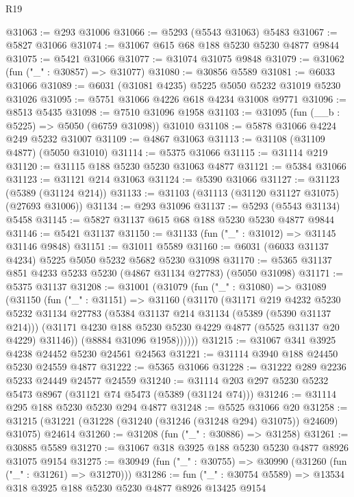 \begin{lexlean}{R19}
\begin{coremodule}
@31063 := @293 @31006
@31066 := @5293 (@5543 @31063) @5483
@31067 := @5827 @31066
@31074 := @31067 @615 @68 @188 @5230 @5230 @4877 @9844
@31075 := @5421 @31066
@31077 := @31074 @31075 @9848
@31079 := @31062 (fun ("_" : @30857) => @31077)
@31080 := @30856 @5589
@31081 := @6033 @31066
@31089 := @6031 (@31081 @4235) @5225 @5050 @5232 @31019 @5230 @31026
@31095 := @5751 @31066 @4226 @618 @4234 @31008 @9771
@31096 := @8513 @5435
@31098 := @7510 @31096 @1958
@31103 := @31095 (fun (__b : @5225) => @5050 (@6759 @31098)) @31010
@31108 := @5878 @31066 @4224 @249 @5232 @31007
@31109 := @4867 @31063
@31113 := @31108 (@31109 @4877) (@5050 @31010)
@31114 := @5375 @31066
@31115 := @31114 @219
@31120 := @31115 @188 @5230 @5230 @31063 @4877
@31121 := @5384 @31066
@31123 := @31121 @214 @31063
@31124 := @5390 @31066
@31127 := @31123 (@5389 (@31124 @214))
@31133 := @31103 (@31113 (@31120 @31127 @31075) (@27693 @31006))
@31134 := @293 @31096
@31137 := @5293 (@5543 @31134) @5458
@31145 := @5827 @31137 @615 @68 @188 @5230 @5230 @4877 @9844
@31146 := @5421 @31137
@31150 := @31133 (fun ("_" : @31012) => @31145 @31146 @9848)
@31151 := @31011 @5589
@31160 := @6031 (@6033 @31137 @4234) @5225 @5050 @5232 @5682 @5230 @31098
@31170 := @5365 @31137 @851 @4233 @5233 @5230 (@4867 @31134 @27783) (@5050 @31098)
@31171 := @5375 @31137
@31208 := @31001
    (@31079
      (fun ("_" : @31080) =>
      @31089
        (@31150
          (fun ("_" : @31151) =>
          @31160
            (@31170
              (@31171
                @219
                @4232
                @5230
                @5232
                @31134
                @27783
                (@5384 @31137 @214 @31134 (@5389 (@5390 @31137 @214)))
                (@31171 @4230 @188 @5230 @5230 @4229 @4877 (@5525 @31137 @20 @4229) @31146))
              (@8884 @31096 @1958))))))
@31215 := @31067 @341 @3925 @4238 @24452 @5230 @24561 @24563
@31221 := @31114 @3940 @188 @24450 @5230 @24559 @4877
@31222 := @5365 @31066
@31228 := @31222 @289 @2236 @5233 @24449 @24577 @24559
@31240 := @31114 @203 @297 @5230 @5232 @5473 @8967 (@31121 @74 @5473 (@5389 (@31124 @74)))
@31246 := @31114 @295 @188 @5230 @5230 @294 @4877
@31248 := @5525 @31066 @20
@31258 := @31215 (@31221 (@31228 (@31240 (@31246 (@31248 @294) @31075)) @24609) @31075) @24614
@31260 := @31208 (fun ("_" : @30886) => @31258)
@31261 := @30885 @5589
@31270 := @31067 @318 @3925 @188 @5230 @5230 @4877 @8926 @31075 @9154
@31275 := @30949 (fun ("_" : @30755) => @30990 (@31260 (fun ("_" : @31261) => @31270)))
@31286 := fun ("_" : @30754 @5589) => @13534 @318 @3925 @188 @5230 @5230 @4877 @8926 @13425 @9154

\end{coremodule}
\end{lexlean}
